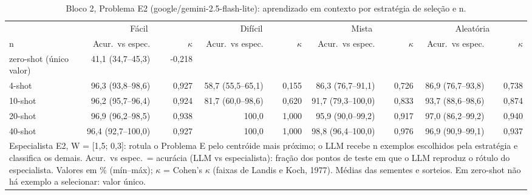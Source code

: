 \begin{table}[htbp]
\centering
\small
\caption{Bloco 2, Problema E2 (google/gemini-2.5-flash-lite): aprendizado em contexto por estratégia de seleção e n.}
\label{tab:bloco2_E2_faseE_estrategia_x_nshot_flashlite}
\begin{tabular}{lrrrrrrrr}
\toprule
 & \multicolumn{2}{c}{Fácil} & \multicolumn{2}{c}{Difícil} & \multicolumn{2}{c}{Mista} & \multicolumn{2}{c}{Aleatória} \\ \cmidrule(lr){2-3} \cmidrule(lr){4-5} \cmidrule(lr){6-7} \cmidrule(lr){8-9}
n & Acur.\ vs espec. & $\kappa$ & Acur.\ vs espec. & $\kappa$ & Acur.\ vs espec. & $\kappa$ & Acur.\ vs espec. & $\kappa$ \\
\midrule
zero-shot (único valor) & 41,1 (34,7–45,3) & -0,218 &  &  &  &  &  &  \\
4-shot & 96,3 (93,8–98,6) & 0,927 & 58,7 (55,5–65,1) & 0,155 & 86,3 (76,7–91,1) & 0,726 & 86,9 (76,7–93,8) & 0,738 \\
10-shot & 96,2 (95,7–96,4) & 0,924 & 81,7 (60,0–98,6) & 0,620 & 91,7 (79,3–100,0) & 0,833 & 93,7 (88,6–98,6) & 0,874 \\
20-shot & 96,9 (96,2–98,5) & 0,938 & 100,0 & 1,000 & 95,9 (90,0–99,2) & 0,917 & 97,0 (86,2–99,2) & 0,940 \\
40-shot & 96,4 (92,7–100,0) & 0,927 & 100,0 & 1,000 & 98,8 (96,4–100,0) & 0,976 & 96,9 (90,9–99,1) & 0,937 \\
\bottomrule
\multicolumn{9}{p{0.95\linewidth}}{\footnotesize Especialista E2, W = [1,5; 0,3]: rotula o Problema E pelo centróide mais próximo; o LLM recebe n exemplos escolhidos pela estratégia e classifica os demais. Acur.\ vs espec.\ = acurácia (LLM vs especialista): fração dos pontos de teste em que o LLM reproduz o rótulo do especialista. Valores em \% (mín–máx); $\kappa$ = Cohen's $\kappa$ (faixas de Landis e Koch, 1977). Médias das sementes e sorteios. Em zero-shot não há exemplo a selecionar: valor único.} \\
\end{tabular}
\end{table}
